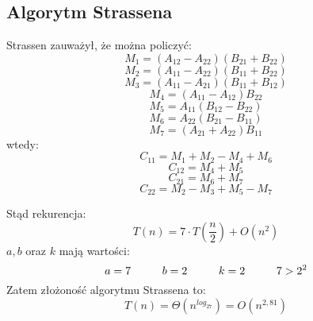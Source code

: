 \subsection{Algorytm Strassena}
Strassen zauważył, że można policzyć:
$$M_1=(A_{12}-A_{22})(B_{21}+B_{22})$$
$$M_2=(A_{11}-A_{22})(B_{11}+B_{22})$$
$$M_3=(A_{11}-A_{21})(B_{11}+B_{12})$$
$$M_4=(A_{11}-A_{12})B_{22}$$
$$M_5=A_{11}(B_{12}-B_{22})$$
$$M_6=A_{22}(B_{21}-B_{11})$$
$$M_7=(A_{21}+A_{22})B_{11}$$
wtedy: 
$$C_{11}=M_1+M_2-M_4+M_6$$
$$C_{12}=M_4+M_5$$
$$C_{21}=M_6+M_7$$
$$C_{22}=M_2-M_3+M_5-M_7$$

Stąd rekurencja:
$$T(n)=7 \cdot T(\frac{n}{2}) + O(n^2)$$
$a,b$ oraz $k$ mają wartości:
$$a=7 \hspace*{1cm} b=2 \hspace*{1cm} k=2 \hspace*{1cm} 7>2^2$$
Zatem złożoność algorytmu Strassena to:
$$T(n)= \Theta(n^{log_27})=O(n^{2,81})$$